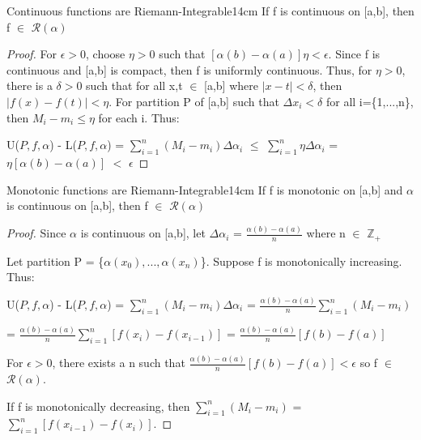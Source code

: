     \begin{wtheorem}{Continuous functions are Riemann-Integrable}{14cm}
        If f is continuous on [a,b], then f $\in$ $\mathscr{R}(\alpha)$
    \end{wtheorem}

    \begin{proof}
        For $\epsilon > 0$, choose $\eta > 0$ such that
        $[\alpha(b)-\alpha(a)] \eta < \epsilon$.
        Since f is continuous and [a,b] is compact, then f is uniformly continuous.
        Thus, for $\eta > 0$, there is a $\delta > 0$ such that
        for all x,t $\in$ [a,b] where $|x-t| < \delta$,
        then $|f(x) - f(t)| < \eta$.
        For partition P of [a,b] such that $\Delta x_i < \delta$ for all
        i=\{1,...,n\}, then $M_i - m_i \leq \eta$ for each i. Thus:
        
        \hspace{0.5cm}
        U($P,f,\alpha$) - L($P,f,\alpha$)
        = $\sum_{i=1}^n (M_i - m_i) \Delta \alpha_i$
        $\leq$ $\sum_{i=1}^n \eta \Delta \alpha_i$
        = $\eta [\alpha(b) - \alpha(a)]$
        $<$ $\epsilon$
    \end{proof}

    \vspace{0.5cm}



    \begin{wtheorem}{Monotonic functions are Riemann-Integrable}{14cm}
        If f is monotonic on [a,b] and $\alpha$ is continuous on [a,b], then
        f $\in$ $\mathscr{R}(\alpha)$        
    \end{wtheorem}
    
    \begin{proof}
        Since $\alpha$ is continuous on [a,b],
        let $\Delta \alpha_i$ = $\frac{\alpha(b) - \alpha(a)}{n}$
        where n $\in$ $\mathbb{Z}_+$

        Let partition P = \{$\alpha(x_0),...,\alpha(x_n)$\}.
        Suppose f is monotonically increasing. Thus:
        
        \hspace{0.5cm}
        U($P,f,\alpha$) - L($P,f,\alpha$)
        = $\sum_{i=1}^n (M_i - m_i) \Delta \alpha_i$
        = $\frac{\alpha(b) - \alpha(a)}{n} \sum_{i=1}^n (M_i - m_i)$

        \hspace{4.5cm}
        = $\frac{\alpha(b) - \alpha(a)}{n} \sum_{i=1}^n [f(x_i) - f(x_{i-1})]$
        = $\frac{\alpha(b) - \alpha(a)}{n} [f(b)-f(a)]$
        
        For $\epsilon > 0$, there exists a n such that
        $\frac{\alpha(b) - \alpha(a)}{n} [f(b)-f(a)] < \epsilon$
        so f $\in$ $\mathscr{R}(\alpha)$.
        
        If f is monotonically decreasing, then
        $\sum_{i=1}^n (M_i - m_i)$ = $\sum_{i=1}^n [f(x_{i-1}) - f(x_i)]$.
    \end{proof}

